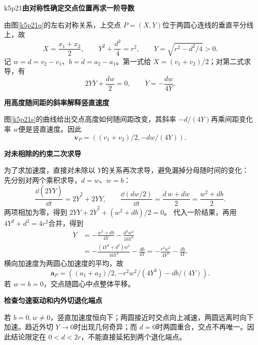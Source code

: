 \begin{drillsolution}{k5p21}\textbf{由对称性确定交点位置再求一阶导数}\par\nobreak
由图\ref{k5p21q}的左右对称关系，上交点 $P=(X,Y)$位于两圆心连线的垂直平分线上，故
\[X=\frac{x_1+x_2}{2},\qquad
Y^2+\frac{d^2}{4}=r^2,\qquad
Y=\sqrt{r^2-d^2/4}>0.\]
记 $w=\dot d=v_2-v_1$、$b=\ddot d=a_2-a_1$。第一式给 $\dot X=(v_1+v_2)/2$；对第二式求导，有
\[2Y\dot Y+\frac{dw}{2}=0,\qquad
\dot Y=-\frac{dw}{4Y}.\]



\par\medskip{}\noindent\textbf{用高度随间距的斜率解释竖直速度}\par\nobreak
图\ref{k5p21s}的曲线给出交点高度如何随间距改变，其斜率 $-d/(4Y)$再乘间距变化率 $w$便是竖直速度。因此
\[\boxed{\bm v_P=((v_1+v_2)/2,-dw/(4Y))}.\]


\par\medskip{}\noindent\textbf{对未相除的约束二次求导}\par\nobreak
为了求加速度，直接对未除以 $Y$的关系再次求导，避免漏掉分母随时间的变化：
先分别对两个乘积求导，$\dot d=w$、$\dot w=b$：
\[
 \frac{\dd(2Y\dot Y)}{\dd t}=2\dot Y^2+2Y\ddot Y,
 \qquad
 \frac{\dd(dw/2)}{\dd t}=\frac{\dot d\,w+d\dot w}{2}
 =\frac{w^2+db}{2}.
\]
两项相加为零，得到 $2Y\ddot Y+2\dot Y^2+(w^2+db)/2=0$。
代入一阶结果，再用 $4Y^2+d^2=4r^2$合并，得到
\begin{align*}
\ddot Y
 &=-\frac{w^2+db}{4Y}-\frac{d^2w^2}{16Y^3}\\
 &=-\frac{(4Y^2+d^2)w^2}{16Y^3}-\frac{db}{4Y}
  =-\frac{r^2w^2}{4Y^3}-\frac{db}{4Y}.
\end{align*}
横向加速度为两圆心加速度的平均，故
\[\boxed{\bm a_P=((a_1+a_2)/2,-r^2w^2/(4Y^3)-db/(4Y))}.\]
若 $w=b=0$，交点随圆心中点整体平移。



\par\medskip{}\noindent\textbf{检查匀速驱动和内外切退化端点}\par\nobreak
若 $b=0,w\ne0$，竖直加速度恒向下；两圆接近时交点向上减速，两圆远离时向下加速。趋近外切 $Y\to0$时出现几何奇异；而 $d=0$时两圆重合，交点不再唯一。因此结论限定在 $0<d<2r$，不能直接延拓到两个退化端点。\end{drillsolution}
